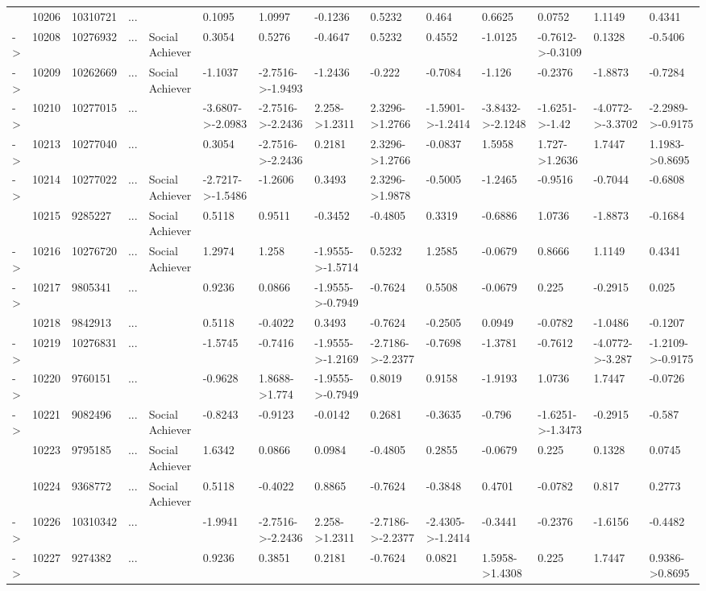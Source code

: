 \documentclass[6pt,a4paper]{article}
\begin{document}
\begin{landscape}
{\begin{longtable}{llllllllllllll}
&10206&10310721&...&&0.1095&1.0997&-0.1236&0.5232&0.464&0.6625&0.0752&1.1149&0.4341\tabularnewline
-\textgreater &10208&10276932&...&Social Achiever&0.3054&0.5276&-0.4647&0.5232&0.4552&-1.0125&-0.7612-\textgreater -0.3109&0.1328&-0.5406\tabularnewline
-\textgreater &10209&10262669&...&Social Achiever&-1.1037&-2.7516-\textgreater -1.9493&-1.2436&-0.222&-0.7084&-1.126&-0.2376&-1.8873&-0.7284\tabularnewline
-\textgreater &10210&10277015&...&&-3.6807-\textgreater -2.0983&-2.7516-\textgreater -2.2436&2.258-\textgreater 1.2311&2.3296-\textgreater 1.2766&-1.5901-\textgreater -1.2414&-3.8432-\textgreater -2.1248&-1.6251-\textgreater -1.42&-4.0772-\textgreater -3.3702&-2.2989-\textgreater -0.9175\tabularnewline
-\textgreater &10213&10277040&...&&0.3054&-2.7516-\textgreater -2.2436&0.2181&2.3296-\textgreater 1.2766&-0.0837&1.5958&1.727-\textgreater 1.2636&1.7447&1.1983-\textgreater 0.8695\tabularnewline
-\textgreater &10214&10277022&...&Social Achiever&-2.7217-\textgreater -1.5486&-1.2606&0.3493&2.3296-\textgreater 1.9878&-0.5005&-1.2465&-0.9516&-0.7044&-0.6808\tabularnewline
&10215&9285227&...&Social Achiever&0.5118&0.9511&-0.3452&-0.4805&0.3319&-0.6886&1.0736&-1.8873&-0.1684\tabularnewline
-\textgreater &10216&10276720&...&Social Achiever&1.2974&1.258&-1.9555-\textgreater -1.5714&0.5232&1.2585&-0.0679&0.8666&1.1149&0.4341\tabularnewline
-\textgreater &10217&9805341&...&&0.9236&0.0866&-1.9555-\textgreater -0.7949&-0.7624&0.5508&-0.0679&0.225&-0.2915&0.025\tabularnewline
&10218&9842913&...&&0.5118&-0.4022&0.3493&-0.7624&-0.2505&0.0949&-0.0782&-1.0486&-0.1207\tabularnewline
-\textgreater &10219&10276831&...&&-1.5745&-0.7416&-1.9555-\textgreater -1.2169&-2.7186-\textgreater -2.2377&-0.7698&-1.3781&-0.7612&-4.0772-\textgreater -3.287&-1.2109-\textgreater -0.9175\tabularnewline
-\textgreater &10220&9760151&...&&-0.9628&1.8688-\textgreater 1.774&-1.9555-\textgreater -0.7949&0.8019&0.9158&-1.9193&1.0736&1.7447&-0.0726\tabularnewline
-\textgreater &10221&9082496&...&Social Achiever&-0.8243&-0.9123&-0.0142&0.2681&-0.3635&-0.796&-1.6251-\textgreater -1.3473&-0.2915&-0.587\tabularnewline
&10223&9795185&...&Social Achiever&1.6342&0.0866&0.0984&-0.4805&0.2855&-0.0679&0.225&0.1328&0.0745\tabularnewline
&10224&9368772&...&Social Achiever&0.5118&-0.4022&0.8865&-0.7624&-0.3848&0.4701&-0.0782&0.817&0.2773\tabularnewline
\newpage
-\textgreater &10226&10310342&...&&-1.9941&-2.7516-\textgreater -2.2436&2.258-\textgreater 1.2311&-2.7186-\textgreater -2.2377&-2.4305-\textgreater -1.2414&-0.3441&-0.2376&-1.6156&-0.4482\tabularnewline
-\textgreater &10227&9274382&...&&0.9236&0.3851&0.2181&-0.7624&0.0821&1.5958-\textgreater 1.4308&0.225&1.7447&0.9386-\textgreater 0.8695\tabularnewline

\end{longtable}}
\end{landscape}
\end{document}
